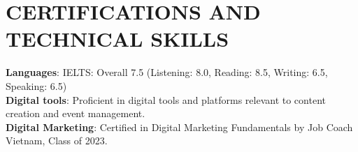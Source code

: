 \documentclass[a4paper,11pt]{article}
\makeatletter
\newcommand{\resumePOR}[3]{
\vspace{0.5mm}\item
    \begin{tabular*}{0.97\textwidth}[t]{l@{\extracolsep{\fill}}r}
        \textbf{#1}\hspace{0.3mm}#2 & \textit{\small{#3}} 
    \end{tabular*}
    \vspace{-2mm}
}
\newcommand{\resumeSubHeadingListStart}{\begin{itemize}[leftmargin=*,labelsep=0mm]}
\newcommand{\resumeSubHeadingListEnd}{\end{itemize}\vspace{2mm}}
\makeatother
\begin{document}
    



\section{\textbf{CERTIFICATIONS AND TECHNICAL SKILLS}}
 \begin{itemize}[leftmargin=0.1in, label={}]
    \small{\item{
     \textbf{Languages}{: IELTS: Overall 7.5 (Listening: 8.0, Reading: 8.5, Writing: 6.5, Speaking: 6.5) } \\
     \textbf{Digital tools}{: Proficient in digital tools and platforms relevant to content creation and event management.} \\
     \textbf{Digital Marketing}{: Certified in Digital Marketing Fundamentals by Job Coach Vietnam, Class of 2023.}
    }}
 \end{itemize}
 \vspace{-16pt}





    



\end{document}
